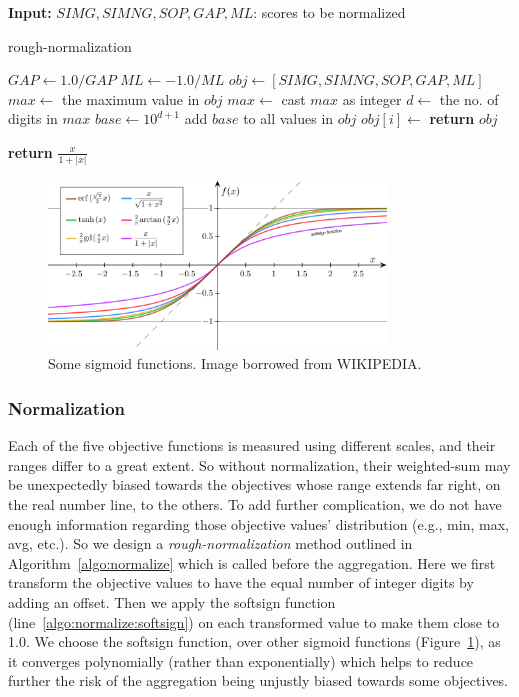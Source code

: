 \begin{algorithm}[!htbp]%
	\textbf{Input:} $SIMG, SIMNG, SOP, GAP, ML$: scores to be normalized
\begin{algorithmic}[1]
		\caption{rough-normalization}
		\label{algo:normalize}
		\State $GAP \gets 1.0/GAP$ 
		\State $ML \gets -1.0/ML$ 
		\State $ obj \gets [SIMG, SIMNG, SOP, GAP, ML]$
		\State $max \gets$ the maximum value in $obj$
		\State $max \gets$ cast $max$ as integer
		\State $d \gets$ the no. of digits in $max$
		\State $ base \gets 10^{d+1}$
		\State add $base$ to all values in $obj$
		\State $obj[i] \gets $ 
		\EndFor
		\State \textbf{return} $obj$
		\Statex

		 \label{algo:normalize:softsign}
		\State \textbf{return} $ \frac{x}{1 + |x|} $
		\EndFunction
	\end{algorithmic}
\end{algorithm}

\begin{figure}[!htbp]\includegraphics[width=0.8\textwidth]{sigmoid}
	\centering
	\caption{Some sigmoid functions. Image borrowed from WIKIPEDIA.}
	\label{fig:sigmoid}
\end{figure}

\subsubsection{Normalization}
Each of the five objective functions is measured using different scales, and their ranges differ to a great extent. So without normalization, their weighted-sum may be unexpectedly biased towards the objectives whose range extends far right, on the real number line, to the others. To add further complication, we do not have enough information regarding those objective values' distribution (e.g., min, max, avg, etc.). So we design a \textit{rough-normalization} method outlined in Algorithm~\ref{algo:normalize} which is called before the aggregation. Here we first transform the objective values to have the equal number of integer digits by adding an offset. Then we apply the softsign function (line~\ref{algo:normalize:softsign}) on each transformed value to make them close to 1.0. We choose the softsign function, over other sigmoid functions (Figure~\ref{fig:sigmoid}), as it converges polynomially (rather than exponentially) which helps to reduce further the risk of the aggregation being unjustly biased towards some objectives. 


